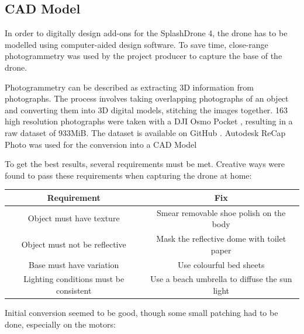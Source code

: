 \newpage
\subsection{CAD Model}
In order to digitally design add-ons for the SplashDrone 4, the drone has to be modelled using computer-aided design software. To save time, close-range photogrammetry was used by the project producer to capture the base of the drone.

Photogrammetry can be described as extracting \gls{3D} information from photographs. The process involves taking overlapping photographs of an object and converting them into \gls{3D} digital models, stitching the images together. 163 high resolution photographs were taken with a DJI Osmo Pocket \cite{osmopocket}, resulting in a raw dataset of 933\gls{MiB}. The dataset is available on GitHub \cite{dronemodel}. Autodesk ReCap Photo was used for the conversion into a \gls{CAD} Model \cite{autodeskrecap}

To get the best results, several requirements must be met. Creative ways were found to pass these requirements when capturing the drone at home:

\begin{center}
\begin{tabular}{ |c|c| } 
 \hline
 Requirement & Fix  \\ 
 \hline
 Object must have texture & Smear removable shoe polish on the body \\ 
 Object must not be reflective & Mask the reflective dome with toilet paper \\ 
 Base must have variation & Use colourful bed sheets \\ 
 Lighting conditions must be consistent & Use a beach umbrella to diffuse the sun light \\ 
 \hline
\end{tabular}
\end{center}

Initial conversion seemed to be good, though some small patching had to be done, especially on the motors:

